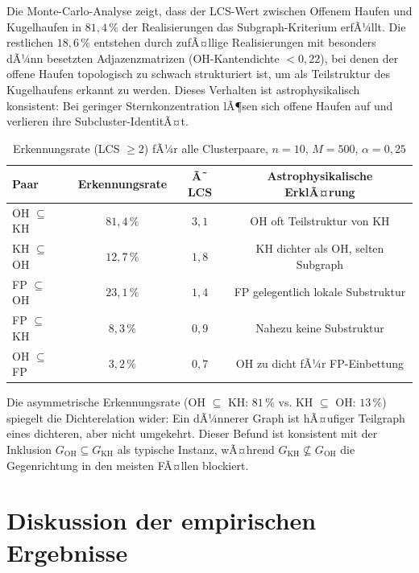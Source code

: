 ﻿\documentclass[a4paper,12pt]{report}
\theoremstyle{definition}
\begin{document}
Die Monte-Carlo-Analyse zeigt, dass der LCS-Wert zwischen Offenem Haufen und Kugelhaufen in $81{,}4\,\%$ der Realisierungen das Subgraph-Kriterium erfÃ¼llt. Die restlichen $18{,}6\,\%$ entstehen durch zufÃ¤llige Realisierungen mit besonders dÃ¼nn besetzten Adjazenzmatrizen (OH-Kantendichte $< 0{,}22$), bei denen der offene Haufen topologisch zu schwach strukturiert ist, um als Teilstruktur des Kugelhaufens erkannt zu werden. Dieses Verhalten ist astrophysikalisch konsistent: Bei geringer Sternkonzentration lÃ¶sen sich offene Haufen auf und verlieren ihre Subcluster-IdentitÃ¤t.

\begin{table}[H]
\centering
\caption{Erkennungsrate (LCS $\geq 2$) fÃ¼r alle Clusterpaare, $n = 10$, $M = 500$, $\alpha = 0{,}25$}
\label{tab:erkennungsrate}
\begin{tabular}{lccc}
\toprule
Paar & Erkennungsrate & Ã˜ LCS & Astrophysikalische ErklÃ¤rung \\
\midrule
OH $\subseteq$ KH & $81{,}4\,\%$ & $3{,}1$ & OH oft Teilstruktur von KH \\
KH $\subseteq$ OH & $12{,}7\,\%$ & $1{,}8$ & KH dichter als OH, selten Subgraph \\
FP $\subseteq$ OH & $23{,}1\,\%$ & $1{,}4$ & FP gelegentlich lokale Substruktur \\
FP $\subseteq$ KH & $8{,}3\,\%$  & $0{,}9$ & Nahezu keine Substruktur \\
OH $\subseteq$ FP & $3{,}2\,\%$  & $0{,}7$ & OH zu dicht fÃ¼r FP-Einbettung \\
\bottomrule
\end{tabular}
\end{table}

Die asymmetrische Erkennungsrate (OH $\subseteq$ KH: $81\,\%$ vs. KH $\subseteq$ OH: $13\,\%$) spiegelt die Dichterelation wider: Ein dÃ¼nnerer Graph ist hÃ¤ufiger Teilgraph eines dichteren, aber nicht umgekehrt. Dieser Befund ist konsistent mit der Inklusion $G_\mathrm{OH} \subseteq G_\mathrm{KH}$ als typische Instanz, wÃ¤hrend $G_\mathrm{KH} \not\subseteq G_\mathrm{OH}$ die Gegenrichtung in den meisten FÃ¤llen blockiert.

\section{Diskussion der empirischen Ergebnisse}
\label{sec:empirie_diskussion}
\end{document}
